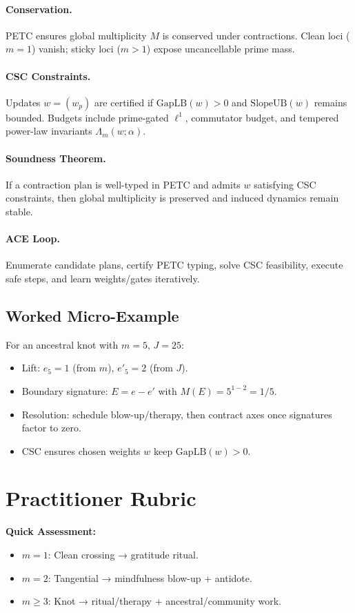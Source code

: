 \documentclass[12pt]{article}
\begin{document}
\paragraph{Conservation.} PETC ensures global multiplicity $M$ is conserved under contractions. Clean loci ($m=1$) vanish; sticky loci ($m>1$) expose uncancellable prime mass.

\paragraph{CSC Constraints.} Updates $w=(w_p)$ are certified if $\mathrm{GapLB}(w)>0$ and $\mathrm{SlopeUB}(w)$ remains bounded. Budgets include prime-gated $\ell^1$, commutator budget, and tempered power-law invariants $\Lambda_m(w;\alpha)$.

\paragraph{Soundness Theorem.} If a contraction plan is well-typed in PETC and admits $w$ satisfying CSC constraints, then global multiplicity is preserved and induced dynamics remain stable.

\paragraph{ACE Loop.} Enumerate candidate plans, certify PETC typing, solve CSC feasibility, execute safe steps, and learn weights/gates iteratively.

\subsection{Worked Micro-Example}
For an ancestral knot with $m=5$, $J=25$:
\begin{itemize}
  \item Lift: $e_5=1$ (from $m$), $e'_5=2$ (from $J$).
  \item Boundary signature: $E=e-e'$ with $M(E)=5^{1-2}=1/5$.
  \item Resolution: schedule blow-up/therapy, then contract axes once signatures factor to zero.
  \item CSC ensures chosen weights $w$ keep $\mathrm{GapLB}(w)>0$.
\end{itemize}

\section{Practitioner Rubric}
\textbf{Quick Assessment:}
\begin{itemize}
  \item $m=1$: Clean crossing → gratitude ritual.
  \item $m=2$: Tangential → mindfulness blow-up + antidote.
  \item $m\geq3$: Knot → ritual/therapy + ancestral/community work.
\end{itemize}
\end{document}
